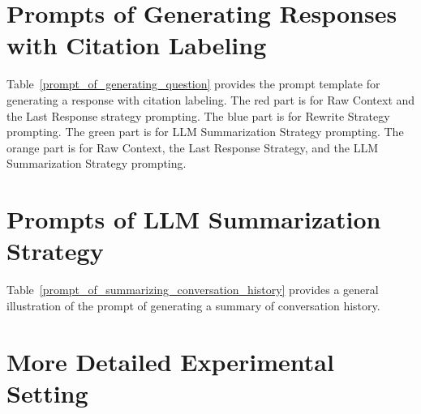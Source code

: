 \documentclass[11pt]{article}
\begin{document}
\section{Prompts of Generating Responses with Citation Labeling}
\label{prompts_of_generating_responses}
Table~\ref{prompt_of_generating_question} provides the prompt template for generating a response with citation labeling. The red part is for Raw Context and the Last Response strategy prompting. 
The blue part is for Rewrite Strategy prompting. 
The green part is for LLM Summarization Strategy prompting. The orange part is for Raw Context, the Last Response Strategy, and the LLM Summarization Strategy prompting.



\section{Prompts of LLM Summarization Strategy}
\label{prompts_of_LLM_summarization_strategy}
Table~\ref{prompt_of_summarizing_conversation_history} provides a general illustration of the prompt of generating a summary of conversation history. 





\section{More Detailed Experimental Setting}
\end{document}
